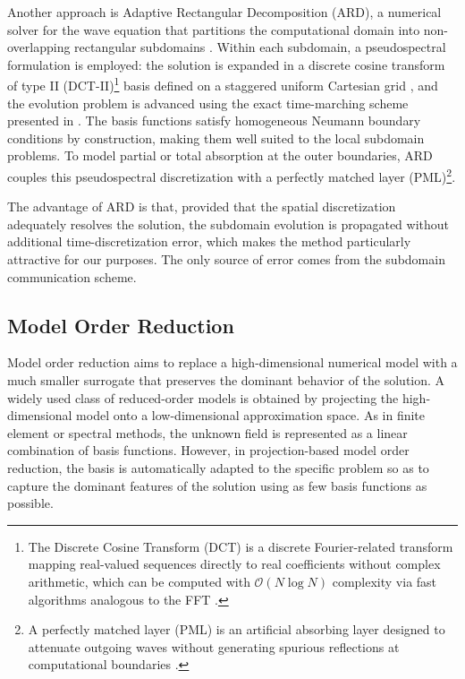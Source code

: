 \documentclass{Configuration_Files/PoliMi3i_thesis}
\newif\ifshowthesischanges
\DeclareRobustCommand{\thesischange}[2]{%
    \ifshowthesischanges
        \textcolor{#1}{#2}%
    \else
        #2%
    \fi
}
\def\thesischange#1#2{#2}%
\begin{document}
Another approach is Adaptive Rectangular Decomposition (ARD), a numerical solver for the wave equation that partitions the computational domain into non-overlapping rectangular subdomains \citep{raghuvanshi_efficient_2009}. Within each subdomain, a pseudospectral formulation is employed: the solution is expanded in a discrete cosine transform of type II (DCT-II)\footnote{\thesischange{red}{The Discrete Cosine Transform (DCT) is a discrete Fourier-related transform mapping real-valued sequences directly to real coefficients without complex arithmetic, which can be computed with $\mathcal{O}(N \log N)$ complexity via fast algorithms analogous to the FFT \citep{rao_discrete_1990}.}} basis defined on a staggered uniform Cartesian grid \citep{rao_discrete_1990}, and the evolution problem is advanced using the exact time-marching scheme presented in \cite{cieslinski_exact_2011}. The basis functions satisfy homogeneous Neumann boundary conditions by construction, making them well suited to the local subdomain problems. To model partial or total absorption at the outer boundaries, ARD couples this pseudospectral discretization with a perfectly matched layer (PML)\footnote{\thesischange{red}{A perfectly matched layer (PML) is an artificial absorbing layer designed to attenuate outgoing waves without generating spurious reflections at computational boundaries \citep{grote2010efficient}.}}.

The advantage of ARD is that, provided that the spatial discretization adequately resolves the solution, the subdomain evolution is propagated without additional time-discretization error, which makes the method particularly attractive for our purposes. The only source of error comes from the subdomain communication scheme.

\subsection{Model Order Reduction}
Model order reduction aims to replace a high-dimensional numerical model with a much smaller surrogate that preserves the dominant behavior of the solution. A widely used class of reduced-order models is obtained by projecting the high-dimensional model onto a low-dimensional approximation space. As in finite element or spectral methods, the unknown field is represented as a linear combination of basis functions. However, in projection-based model order reduction, the basis is automatically adapted to the specific problem so as to capture the dominant features of the solution using as few basis functions as possible.
\end{document}
